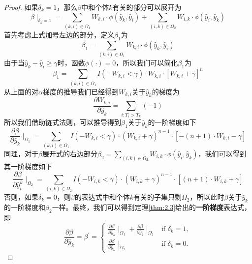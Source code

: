 \begin{proof}
如果$\delta_k = 1$，那么$\beta$中和个体$k$有关的部分可以展开为$$\beta \mid_{\delta_k=1}=\sum_{(k,i)\in \Omega_1} W_{k,i}\cdot \phi(\hat{y}_k, \hat{y}_i) + \sum_{(i,k)\in \Omega_2} W_{i,k}\cdot \phi(\hat{y}_i, \hat{y}_k) $$ 首先考虑上式加号左边的部分，定义$\beta_1$为$$\beta_1 = \sum_{(k,i)\in \Omega_1} W_{k,i}\cdot \phi(\hat{y}_k, \hat{y}_i)$$ 由于当$\hat{y}_k - \hat{y}_i \ge \gamma$时，函数$\phi(\cdot)=0$，所以我们可以简化$\beta_1$为$$\beta_1 = \sum_{(k,i)\in \Omega_1} I(-W_{k,i} < \gamma) \cdot W_{k,i}\cdot [W_{k,i} + \gamma]^n $$ 从上面的对$\alpha$梯度的推导我们已经得到$W_{k,i}$关于$\hat{y}_k$的梯度为$$\frac{\partial W_{k,i}}{\partial \hat{y}_k} = \sum\limits_{i: T_i>T_k}(-1)$$ 所以我们借助链式法则，可以推导得到$\beta_1$关于$\hat{y}_k$的一阶梯度如下$$
\frac{\partial \beta}{\partial \hat{y}_k} \mid_{\Omega_1} = \sum\limits_{(k,i)\in \Omega_1} {I(-W_{k,i}<\gamma)\cdot (W_{k,i}+\gamma)^{n-1}\cdot [-(n+1)\cdot W_{k,i}-\gamma]}
$$ 同理，对于$\beta$展开式的右边部分$\beta_2=\sum_{(i,k)\in \Omega_2} W_{i,k}\cdot \phi(\hat{y}_i, \hat{y}_k)$，我们可以得到其一阶梯度如下$$
\frac{\partial \beta}{\partial \hat{y}_t^k} \mid_{\Omega_2} = \sum\limits_{(i,k)\in \Omega_2} {I(-W_{i,k}<\gamma)\cdot (W_{i,k}+\gamma)^{n-1}\cdot [(n+1)\cdot W_{i,k}+\gamma]}
$$ 否则，如果$\delta_k = 0$，则$\beta$的表达式中和个体$k$有关的子集只剩$\Omega_2$，所以此时$\beta$关于$\hat{y}_k$的一阶梯度和$\beta_2$一样。最终，我们可以得到定理\ref{thm:2.3}给出的\textbf{一阶梯度}表达式，即$$
\frac{\partial \beta}{\partial \hat{y}_k}=\beta^{'}=
\begin{cases}
\frac{\partial \beta}{\partial \hat{y}_k} \mid_{\Omega_1} + \frac{\partial \beta}{\partial \hat{y}_k} \mid_{\Omega_2} & \text{if } \delta_k = 1,\\
\frac{\partial \beta}{\partial \hat{y}_k} \mid_{\Omega_2} & \text{if } \delta_k = 0.
\end{cases}
$$
\end{proof}

